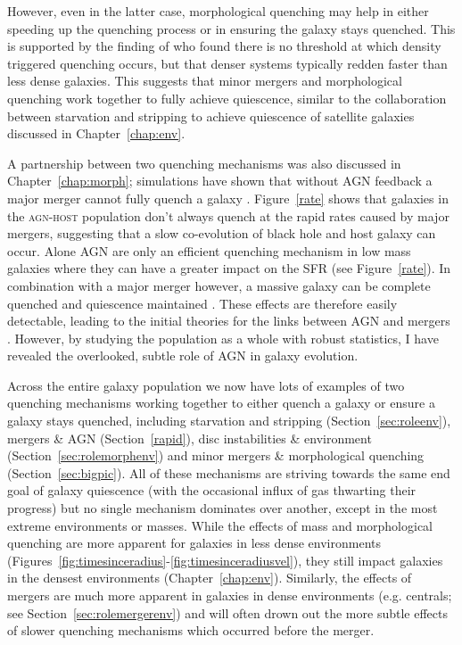 However, even in the latter case, morphological quenching may help in either speeding up the quenching process or in ensuring the galaxy stays quenched. This is supported by the finding of \cite{abramson16} who found there is no threshold at which density triggered quenching occurs, but that denser systems typically redden faster than less dense galaxies. This suggests that minor mergers and morphological quenching work together to fully achieve quiescence, similar to the collaboration between starvation and stripping to achieve quiescence of satellite galaxies discussed in Chapter~\ref{chap:env}. 

A partnership between two quenching mechanisms was also discussed in Chapter~\ref{chap:morph}; simulations have shown that without AGN feedback a major merger cannot fully quench a galaxy \citep{springel05b}. Figure~\ref{rate} shows that galaxies in the \textsc{agn-host} population don't always quench at the rapid rates caused by major mergers, suggesting that a slow co-evolution of black hole and host galaxy can occur. Alone AGN are only an efficient quenching mechanism in low mass galaxies where they can have a greater impact on the SFR (see Figure~\ref{rate}). In combination with a major merger however, a massive galaxy can be complete quenched and quiescence maintained \citep{conselice03, springel05b, hopkins08a, pontzen16}. These effects are therefore easily detectable, leading to the initial theories for the links between AGN and mergers \citep{merritt01, hopkins06b, hopkins08a, hopkins08b, peng07, jahnke11}. However, by studying the population as a whole with robust statistics, I have revealed the overlooked, subtle role of AGN in galaxy evolution. 

Across the entire galaxy population we now have lots of examples of two quenching mechanisms working together to either quench a galaxy or ensure a galaxy stays quenched, including starvation and stripping (Section~\ref{sec:roleenv}), mergers \& AGN (Section~\ref{rapid}), disc instabilities \&  environment (Section~\ref{sec:rolemorphenv}) and minor mergers \& morphological quenching (Section~\ref{sec:bigpic}). All of these mechanisms are striving towards the same end goal of galaxy quiescence (with the occasional influx of gas thwarting their progress) but no single mechanism dominates over another, except in the most extreme environments or masses. While the effects of mass and morphological quenching are more apparent for galaxies in less dense environments (Figures~\ref{fig:timesinceradius}-\ref{fig:timesinceradiusvel}), they still impact galaxies in the densest environments (Chapter~\ref{chap:env}). Similarly, the effects of mergers are much more apparent in galaxies in dense environments (e.g. centrals; see Section~\ref{sec:rolemergerenv}) and will often drown out the more subtle effects of slower quenching mechanisms which occurred before the merger. %

